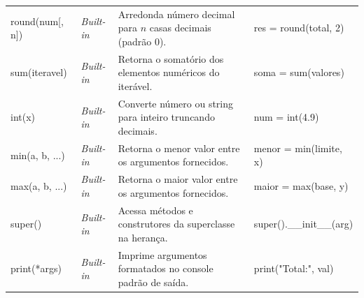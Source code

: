 \begin{center}
\begin{tabularx}{\textwidth}{@{} >{\ttfamily}l l >{\RaggedRight}X >{\ttfamily}l @{}}
round(num[, n]) & \emph{Built-in} & Arredonda número decimal para $n$ casas decimais (padrão $0$). & res = round(total, 2) \\
sum(iteravel) & \emph{Built-in} & Retorna o somatório dos elementos numéricos do iterável. & soma = sum(valores) \\
int(x) & \emph{Built-in} & Converte número ou string para inteiro truncando decimais. & num = int(4.9) \\
min(a, b, ...) & \emph{Built-in} & Retorna o menor valor entre os argumentos fornecidos. & menor = min(limite, x) \\
max(a, b, ...) & \emph{Built-in} & Retorna o maior valor entre os argumentos fornecidos. & maior = max(base, y) \\
super() & \emph{Built-in} & Acessa métodos e construtores da superclasse na herança. & super().\_\_init\_\_(arg) \\
print(*args) & \emph{Built-in} & Imprime argumentos formatados no console padrão de saída. & print("Total:", val) \\
\bottomrule
\end{tabularx}
\end{center}
